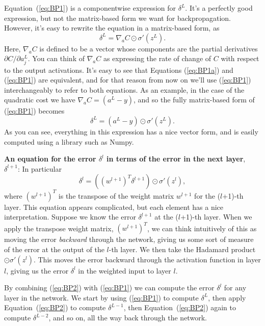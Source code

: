 \documentclass[a4paper,twoside,10pt]{book}
\begin{document}
Equation~(\ref{eq:BP1}) is a componentwise expression for $\delta^L$. It's a perfectly good expression, but not the matrix-based form we want for backpropagation. However, it's easy to rewrite the equation in a matrix-based form, as
\begin{equation}
\delta^L = \nabla_a C \odot \sigma'(z^L).
\tag{BP1a}\label{eq:BP1a}
\end{equation}
Here, $\nabla_a C$ is defined to be a vector whose components are the partial derivatives $\partial{}C/\partial{}a^L_j$. You can think of $\nabla_a C$ as expressing the rate of change of $C$ with respect to the output activations. It's easy to see that Equations (\ref{eq:BP1a}) and (\ref{eq:BP1}) are equivalent, and for that reason from now on we'll use (\ref{eq:BP1}) interchangeably to refer to both equations. As an example, in the case of the quadratic cost we have $\nabla_a C =(a^L-y)$, and so the fully matrix-based form of (\ref{eq:BP1}) becomes
\begin{equation}
\delta^L = (a^L-y) \odot \sigma'(z^L).
\tag{30}\label{eq:30}
\end{equation}
As you can see, everything in this expression has a nice vector form, and is easily computed using a library such as Numpy.

\textbf{An equation for the error $\delta^l$ in terms of the error in the next layer}, $\delta^{l+1}$: In particular
\begin{equation}
	\delta^l = \left((w^{l+1})^T \delta^{l+1}\right) \odot \sigma'(z^l),
	\tag{BP2}\label{eq:BP2}
\end{equation}
where $(w^{l+1})^T$ is the transpose of the weight matrix $w^{l+1}$ for the ($l$+1)-th layer. This equation appears complicated, but each element has a nice interpretation. Suppose we know the error $\delta^{l+1}$ at the ($l$+1)-th layer. When we apply the transpose weight matrix, $(w^{l+1})^T$, we can think intuitively of this as moving the error \textit{backward} through the network, giving us some sort of measure of the error at the output of the $l$-th layer. We then take the Hadamard product $\odot \sigma'(z^l)$. This moves the error backward through the activation function in layer $l$, giving us the error $\delta^l$ in the weighted input to layer $l$.

By combining (\ref{eq:BP2}) with (\ref{eq:BP1}) we can compute the error $\delta^l$ for any layer in the network. We start by using (\ref{eq:BP1}) to compute $\delta^L$, then apply Equation~(\ref{eq:BP2}) to compute $\delta^{L-1}$, then Equation~(\ref{eq:BP2}) again to compute $\delta^{L-2}$, and so on, all the way back through the network.
\end{document}
